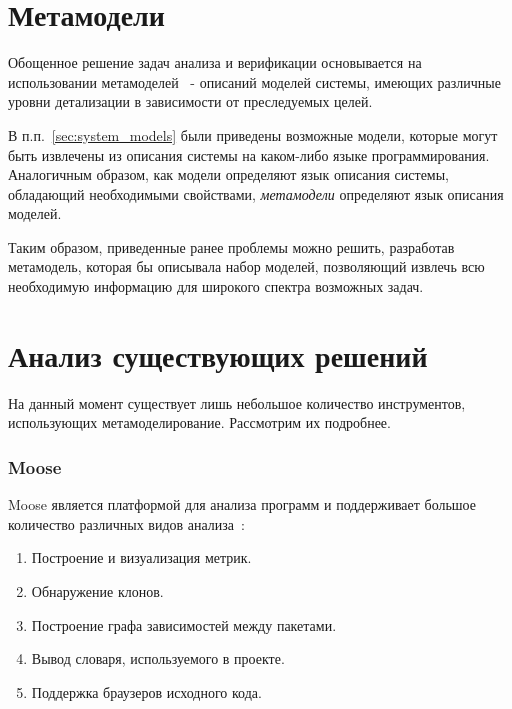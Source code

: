 \section{Метамодели}
\label{sec:metamodels}

Обощенное решение задач анализа и верификации основывается на использовании
метамоделей~\cite{metamodeling} - описаний моделей системы, имеющих различные
уровни детализации в зависимости от преследуемых целей.

В п.п.~\ref{sec:system_models} были приведены возможные модели, которые могут
быть извлечены из описания системы на каком-либо языке программирования.
Аналогичным образом, как модели определяют язык описания системы, обладающий
необходимыми свойствами, \emph{метамодели} определяют язык описания моделей.

Таким образом, приведенные ранее проблемы можно решить, разработав метамодель,
которая бы описывала набор моделей, позволяющий извлечь всю необходимую
информацию для широкого спектра возможных задач.

\section{Анализ существующих решений}
\label{sec:analysis}

На данный момент существует лишь небольшое количество инструментов, использующих
метамоделирование. Рассмотрим их подробнее.

\subsubsection{Moose}

Moose является платформой для анализа программ и поддерживает большое количество
различных видов анализа~\cite{moose}:

\begin{enumerate}
    \item Построение и визуализация метрик.
    \item Обнаружение клонов.
    \item Построение графа зависимостей между пакетами.
    \item Вывод словаря, используемого в проекте.
    \item Поддержка браузеров исходного кода.
\end{enumerate}

